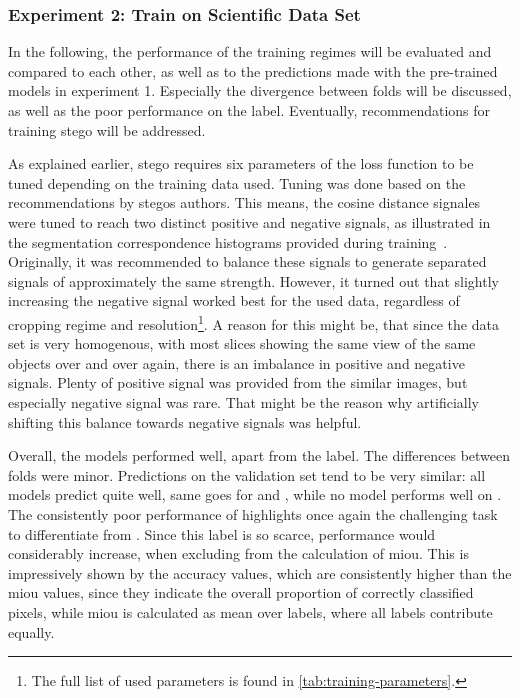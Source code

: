 \afterpage{\FloatBarrier}

\subsubsection{Experiment 2: Train on Scientific Data Set}\label{subsubsec:discussion-experiment2}
In the following, the performance of the training regimes will be evaluated and compared to each other, as well as to the predictions made with the pre-trained models in experiment 1.
Especially the divergence between folds will be discussed, as well as the poor performance on the  label.
Eventually, recommendations for training \gls{stego} will be addressed.

As explained earlier, \gls{stego} requires six parameters of the loss function to be tuned depending on the training data used.
Tuning was done based on the recommendations by \gls{stego}s authors.
This means, the cosine distance signales were tuned to reach two distinct positive and negative signals, as illustrated in the segmentation correspondence histograms provided during training~\autocite{Hamilton2022}.
Originally, it was recommended to balance these signals to generate separated signals of approximately the same strength.
However, it turned out that slightly increasing the negative signal worked best for the used data, regardless of cropping regime and resolution\footnote{The full list of used parameters is found in \autoref{tab:training-parameters}.}.
A reason for this might be, that since the data set is very homogenous, with most slices showing the same view of the same objects over and over again, there is an imbalance in positive and negative signals.
Plenty of positive signal was provided from the similar images, but especially negative signal was rare.
That might be the reason why artificially shifting this balance towards negative signals was helpful.

Overall, the models performed well, apart from the  label.
The differences between folds were minor.
Predictions on the validation set tend to be very similar: all models predict  quite well, same goes for  and , while no model performs well on .
The consistently poor performance of  highlights once again the challenging task to differentiate  from .
Since this label is so scarce, performance would considerably increase, when excluding  from the calculation of \gls{miou}.
This is impressively shown by the accuracy values, which are consistently higher than the \gls{miou} values, since they indicate the overall proportion of correctly classified pixels, while \gls{miou} is calculated as mean over labels, where all labels contribute equally.

